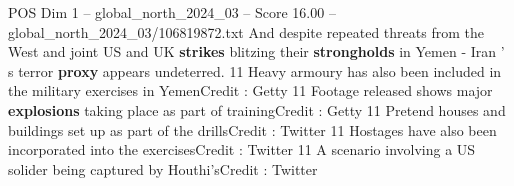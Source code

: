 \begin{textsample}{POS Dim 1 – global\_north\_2024\_03 – Score 16.00 – global\_north\_2024\_03/106819872.txt}
And despite repeated threats from the West and joint US and UK \textbf{strikes} blitzing their \textbf{strongholds} in Yemen - Iran ' s terror \textbf{proxy} appears undeterred. 11 Heavy armoury has also been included in the military exercises in YemenCredit : Getty 11 Footage released shows major \textbf{explosions} taking place as part of trainingCredit : Getty 11 Pretend houses and buildings set up as part of the drillsCredit : Twitter 11 Hostages have also been incorporated into the exercisesCredit : Twitter 11 A scenario involving a US solider being captured by Houthi'sCredit : Twitter

\end{textsample}
